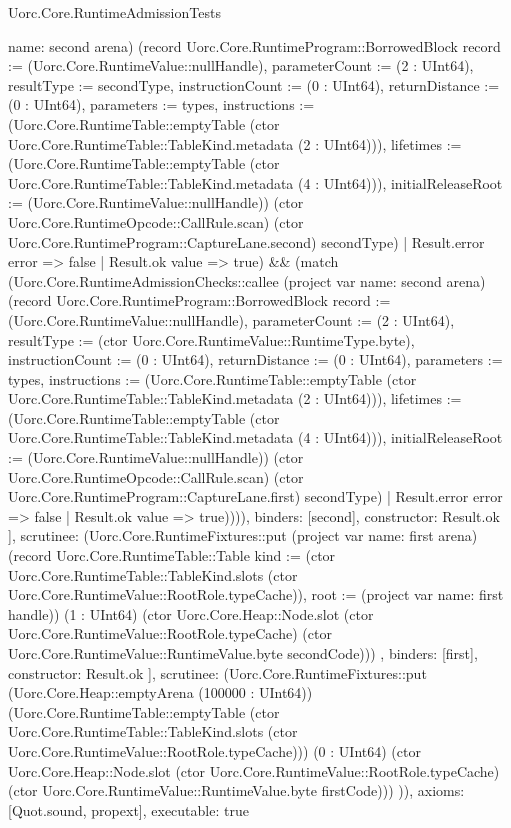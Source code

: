 \begin{lexlean}{Uorc.Core.RuntimeAdmissionTests}
\begin{semanticmodule}
{{{{{{                      name: second
                    } arena) (record Uorc.Core.RuntimeProgram::BorrowedBlock {record := (Uorc.Core.RuntimeValue::nullHandle), parameterCount := (2 : UInt64), resultType := secondType, instructionCount := (0 : UInt64), returnDistance := (0 : UInt64), parameters := types, instructions := (Uorc.Core.RuntimeTable::emptyTable (ctor Uorc.Core.RuntimeTable::TableKind.metadata (2 : UInt64))), lifetimes := (Uorc.Core.RuntimeTable::emptyTable (ctor Uorc.Core.RuntimeTable::TableKind.metadata (4 : UInt64))), initialReleaseRoot := (Uorc.Core.RuntimeValue::nullHandle)}) (ctor Uorc.Core.RuntimeOpcode::CallRule.scan) (ctor Uorc.Core.RuntimeProgram::CaptureLane.second) secondType)
                    | Result.error error => false
                    | Result.ok value => true) && (match (Uorc.Core.RuntimeAdmissionChecks::callee (project var{
                      name: second
                    } arena) (record Uorc.Core.RuntimeProgram::BorrowedBlock {record := (Uorc.Core.RuntimeValue::nullHandle), parameterCount := (2 : UInt64), resultType := (ctor Uorc.Core.RuntimeValue::RuntimeType.byte), instructionCount := (0 : UInt64), returnDistance := (0 : UInt64), parameters := types, instructions := (Uorc.Core.RuntimeTable::emptyTable (ctor Uorc.Core.RuntimeTable::TableKind.metadata (2 : UInt64))), lifetimes := (Uorc.Core.RuntimeTable::emptyTable (ctor Uorc.Core.RuntimeTable::TableKind.metadata (4 : UInt64))), initialReleaseRoot := (Uorc.Core.RuntimeValue::nullHandle)}) (ctor Uorc.Core.RuntimeOpcode::CallRule.scan) (ctor Uorc.Core.RuntimeProgram::CaptureLane.first) secondType)
                    | Result.error error => false
                    | Result.ok value => true)))),
                  binders: [second],
                  constructor: Result.ok
                }
              ],
              scrutinee: (Uorc.Core.RuntimeFixtures::put (project var{
                name: first
              } arena) (record Uorc.Core.RuntimeTable::Table {kind := (ctor Uorc.Core.RuntimeTable::TableKind.slots (ctor Uorc.Core.RuntimeValue::RootRole.typeCache)), root := (project var{
                name: first
              } handle)}) (1 : UInt64) (ctor Uorc.Core.Heap::Node.slot (ctor Uorc.Core.RuntimeValue::RootRole.typeCache) (ctor Uorc.Core.RuntimeValue::RuntimeValue.byte secondCode)))
            },
            binders: [first],
            constructor: Result.ok
          }
        ],
        scrutinee: (Uorc.Core.RuntimeFixtures::put (Uorc.Core.Heap::emptyArena (100000 : UInt64)) (Uorc.Core.RuntimeTable::emptyTable (ctor Uorc.Core.RuntimeTable::TableKind.slots (ctor Uorc.Core.RuntimeValue::RootRole.typeCache))) (0 : UInt64) (ctor Uorc.Core.Heap::Node.slot (ctor Uorc.Core.RuntimeValue::RootRole.typeCache) (ctor Uorc.Core.RuntimeValue::RuntimeValue.byte firstCode)))
      })),
  axioms: [Quot.sound, propext],
  executable: true
}


\end{semanticmodule}
\end{lexlean}
